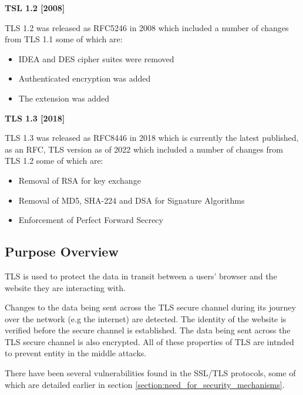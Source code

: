 \documentclass{mscreport}
\begin{document}
\vspace{0.7cm} \noindent
\textbf{TSL 1.2 [2008]}

\noindent
TLS 1.2 was released as RFC5246 in 2008 \cite{Dierks2008-uy} which included a number of changes from TLS 1.1 some of which are:
\begin{itemize}
  \setlength\itemsep{0.1em}
  \item IDEA and DES cipher suites were removed
  \item Authenticated encryption was added
  \item The extension \texttt{} was added
\end{itemize}

\vspace{0.7cm} \noindent
\textbf{TLS 1.3 [2018]}

\noindent
TLS 1.3 was released as RFC8446 in 2018 \cite{Rescorla2018-wb} which is currently the latest published, as an RFC, TLS version as of 2022 which included a number of changes from TLS 1.2 some of which are:
\begin{itemize}
  \setlength\itemsep{0.1em}
  \item Removal of RSA for key exchange
  \item Removal of MD5, SHA-224 and DSA for Signature Algorithms
  \item Enforcement of Perfect Forward Secrecy
\end{itemize}

\subsection{Purpose Overview}

\noindent
TLS is used to protect the data in transit between a users' browser and the website they are interacting with.

\vspace{0.3cm} \noindent
Changes to the data being sent across the TLS secure channel during its journey over the network (e.g the internet) are detected. The identity of the website is verified before the secure channel is established. The data being sent across the TLS secure channel is also encrypted. All of these properties of TLS are intnded to prevent entity in the middle attacks.

\vspace{0.3cm} \noindent There have been several vulnerabilities found in the SSL/TLS protocols, some of which are detailed earlier in section \ref{section:need_for_security_mechanisms}. 
\end{document}
